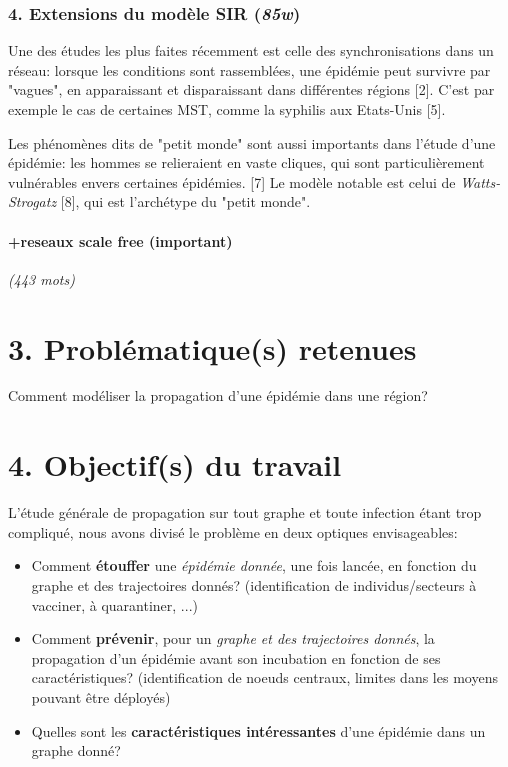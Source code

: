 \documentclass{article}
\begin{document}
\subsubsection*{4. Extensions du modèle SIR (\textit{85w})}

Une des études les plus faites récemment est celle des synchronisations dans un réseau: lorsque les conditions sont rassemblées, une épidémie peut survivre par "vagues", en apparaissant et disparaissant dans différentes régions [2]. C'est par exemple le cas de certaines MST, comme la syphilis aux Etats-Unis [5].

Les phénomènes dits de "petit monde" sont aussi importants dans l'étude d'une épidémie: les hommes se relieraient en vaste cliques, qui sont particulièrement vulnérables envers certaines épidémies. [7] Le modèle notable est celui de \textit{Watts-Strogatz} [8], qui est l'archétype du "petit monde".

\paragraph{+reseaux scale free (important)}\mbox{}\newline

\textit{(443 mots)}

\section*{3. Problématique(s) retenues}

Comment modéliser la propagation d'une épidémie dans une région?

\section*{4. Objectif(s) du travail}

L'étude générale de propagation sur tout graphe et toute infection étant trop compliqué, nous avons divisé le problème en deux optiques envisageables:


\begin{itemize}
\item  Comment \textbf{étouffer} une \textit{épidémie donnée}, une fois lancée, en fonction du graphe et des trajectoires donnés? (identification de individus/secteurs à vacciner, à quarantiner, ...)
\item  Comment \textbf{prévenir}, pour un \textit{graphe et des trajectoires donnés}, la propagation d'un épidémie avant son incubation en fonction de ses caractéristiques? (identification de noeuds centraux, limites dans les moyens pouvant être déployés)
\item  Quelles sont les \textbf{caractéristiques intéressantes} d'une épidémie dans un graphe donné?

\end{itemize}
\end{document}
